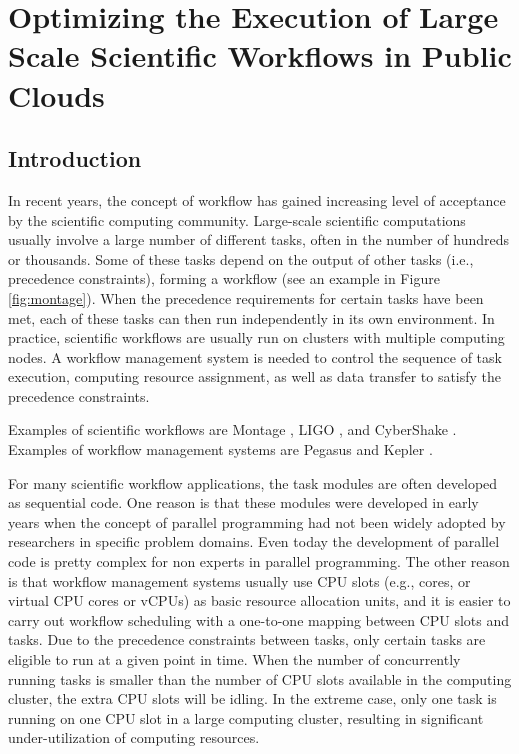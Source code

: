 \chapter{Optimizing the Execution of Large Scale Scientific Workflows in Public Clouds}
\label{chapter:dewe_v1}

\section{Introduction}
\label{sec:dewe_v1_intro}

In recent years, the concept of workflow has gained increasing level of acceptance by the scientific computing community. Large-scale scientific computations usually involve a large number of different tasks, often in the number of hundreds or thousands. Some of these tasks depend on the output of other tasks (i.e., precedence constraints), forming a workflow (see an example in Figure \ref{fig:montage}). When the precedence requirements for certain tasks have been met, each of these tasks can then run independently in its own environment. In practice, scientific workflows are usually run on clusters with multiple computing nodes. A workflow management system is needed to control the sequence of task execution, computing resource assignment, as well as data transfer to satisfy the precedence constraints. 

Examples of scientific workflows are Montage \cite{montage, web:montage}, LIGO \cite{ligo}, and CyberShake \cite{cybershake}. Examples of workflow management systems are Pegasus \cite{pegasus} and Kepler \cite{kepler}.

For many scientific workflow applications, the task modules are often developed as sequential code. One reason is that these modules were developed in early years when the concept of parallel programming had not been widely adopted by researchers in specific problem domains. Even today the development of parallel code is pretty complex for non experts in parallel programming. The other reason is that workflow management systems usually use CPU slots (e.g., cores, or virtual CPU cores or vCPUs) as basic resource allocation units, and it is easier to carry out workflow scheduling with a one-to-one mapping between CPU slots and tasks. Due to the precedence constraints between tasks, only certain tasks are eligible to run at a given point in time. When the number of concurrently running tasks is smaller than the number of CPU slots available in the computing cluster, the extra CPU slots will be idling. In the extreme case, only one task is running on one CPU slot in a large computing cluster, resulting in significant under-utilization of computing resources.

